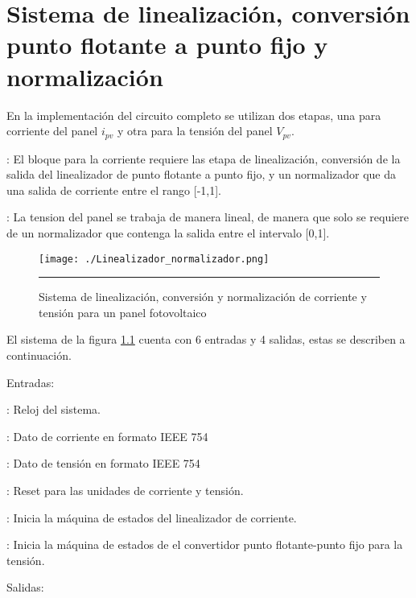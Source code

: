 \chapter{Sistema de linealización, conversión punto flotante a punto fijo y normalización}

En la implementación del circuito completo se utilizan dos etapas, una para corriente del panel $i_{pv}$ y otra para la tensión del panel $V_{pv}$.

\begin{compactitem}

\item {}: El bloque para la corriente requiere las etapa de linealización, conversión de la salida del linealizador de punto flotante a punto fijo, y un normalizador que da una salida de corriente entre el rango [-1,1].

\item {}: La tension del panel se trabaja de manera lineal, de manera que solo se requiere de un normalizador que contenga la salida entre el intervalo [0,1]. 

\end{compactitem}

\begin{figure}[H]
  \centering
    \texttt{[image: ./Linealizador\_normalizador.png]}
    \rule{35em}{0.5pt}
  \caption[Sistema de linealización, conversión y normalización de corriente y tensión para un panel fotovoltaico]{Sistema de linealización, conversión y normalización de corriente y tensión para un panel fotovoltaico}
  \label{fig:Sist1}
\end{figure}


El sistema de la figura \ref{fig:Sist1} cuenta con 6 entradas y 4 salidas, estas se describen a continuación. 

Entradas:
\begin{compactitem}

\item {}: Reloj del sistema.
\item {}: Dato de corriente en formato IEEE 754
\item {}: Dato de tensión en formato IEEE 754
\item {}: Reset para las unidades de corriente y tensión. 
\item {}: Inicia la máquina de estados del linealizador de corriente. 
\item {}: Inicia la máquina de estados de el convertidor punto flotante-punto fijo para la tensión. 

\end{compactitem}
Salidas:

